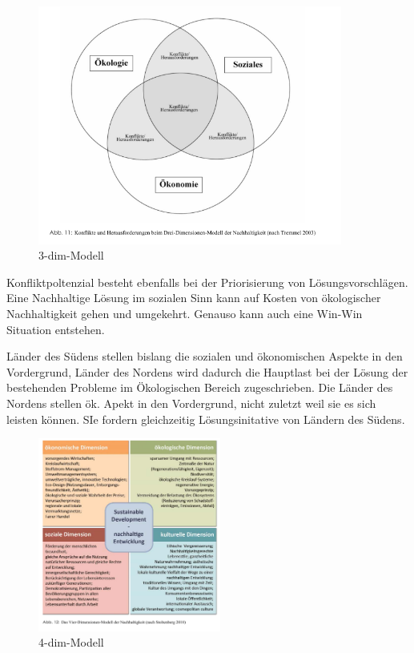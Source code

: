 \documentclass{article}
\begin{document}
\begin{figure}[h]
\centering
\includegraphics[width=10cm]{image_folder/dreidimensionenmodell_der_N.png}
\caption{3-dim-Modell}
\label{fig:3-dimensionen Modell}
\end{figure}

Konfliktpoltenzial besteht ebenfalls bei der Priorisierung von Lösungsvorschlägen. Eine Nachhaltige Lösung im sozialen Sinn kann auf Kosten von ökologischer Nachhaltigkeit gehen und umgekehrt. Genauso kann auch eine Win-Win Situation entstehen.

Länder des Südens stellen bislang die sozialen und ökonomischen Aspekte in den Vordergrund, Länder des Nordens wird dadurch die Hauptlast bei der Lösung der bestehenden Probleme im Ökologischen Bereich zugeschrieben. Die Länder des Nordens stellen ök. Apekt in den Vordergrund, nicht zuletzt weil sie es sich leisten können. SIe fordern gleichzeitig Lösungsinitative von Ländern des Südens.

\begin{figure}[h]
\centering
\includegraphics[width=6cm]{image_folder/vierdimensionenmodell_der_N.png}
\caption{4-dim-Modell}
\label{fig:4-dimensionen Modell}
\end{figure}
\end{document}

